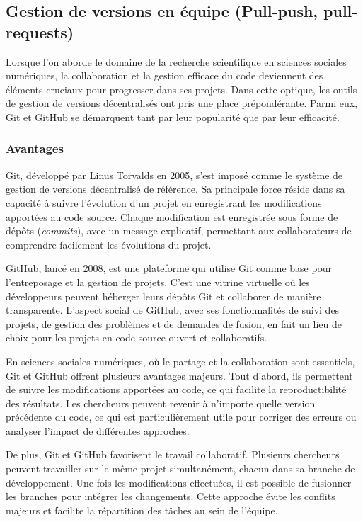 \documentclass[
  letterpaper,
]{scrbook}
\begin{document}
\hypertarget{gestion-de-versions-en-uxe9quipe-pull-push-pull-requests}{%
\subsection{Gestion de versions en équipe (Pull-push,
pull-requests)}\label{gestion-de-versions-en-uxe9quipe-pull-push-pull-requests}}

Lorsque l'on aborde le domaine de la recherche scientifique en sciences
sociales numériques, la collaboration et la gestion efficace du code
deviennent des éléments cruciaux pour progresser dans ses projets. Dans
cette optique, les outils de gestion de versions décentralisés ont pris
une place prépondérante. Parmi eux, Git et GitHub se démarquent tant par
leur popularité que par leur efficacité.

\hypertarget{avantages-1}{%
\subsubsection{Avantages}\label{avantages-1}}

Git, développé par Linus Torvalds en 2005, s'est imposé comme le système
de gestion de versions décentralisé de référence. Sa principale force
réside dans sa capacité à suivre l'évolution d'un projet en enregistrant
les modifications apportées au code source. Chaque modification est
enregistrée sous forme de dépôts (\emph{commits}), avec un message
explicatif, permettant aux collaborateurs de comprendre facilement les
évolutions du projet.

GitHub, lancé en 2008, est une plateforme qui utilise Git comme base
pour l'entreposage et la gestion de projets. C'est une vitrine virtuelle
où les développeurs peuvent héberger leurs dépôts Git et collaborer de
manière transparente. L'aspect social de GitHub, avec ses
fonctionnalités de suivi des projets, de gestion des problèmes et de
demandes de fusion, en fait un lieu de choix pour les projets en code
source ouvert et collaboratifs.

En sciences sociales numériques, où le partage et la collaboration sont
essentiels, Git et GitHub offrent plusieurs avantages majeurs. Tout
d'abord, ils permettent de suivre les modifications apportées au code,
ce qui facilite la reproductibilité des résultats. Les chercheurs
peuvent revenir à n'importe quelle version précédente du code, ce qui
est particulièrement utile pour corriger des erreurs ou analyser
l'impact de différentes approches.

De plus, Git et GitHub favorisent le travail collaboratif. Plusieurs
chercheurs peuvent travailler sur le même projet simultanément, chacun
dans sa branche de développement. Une fois les modifications effectuées,
il est possible de fusionner les branches pour intégrer les changements.
Cette approche évite les conflits majeurs et facilite la répartition des
tâches au sein de l'équipe.
\end{document}
